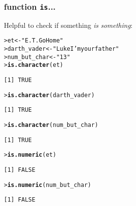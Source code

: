 \documentclass[13pt,aspectratio=169]{beamer}\usepackage[]{graphicx}\usepackage[]{color}
\makeatletter
\newcommand{\hlstr}[1]{\textcolor[rgb]{0.192,0.494,0.8}{#1}}%
\newcommand{\hlstd}[1]{\textcolor[rgb]{0.345,0.345,0.345}{#1}}%
\newcommand{\hlkwb}[1]{\textcolor[rgb]{0.69,0.353,0.396}{#1}}%
\newcommand{\hlkwd}[1]{\textcolor[rgb]{0.737,0.353,0.396}{\textbf{#1}}}%
\newenvironment{kframe}{%
 \def\at@end@of@kframe{}%
 \ifinner\ifhmode%
  \def\at@end@of@kframe{\end{minipage}}%
  \begin{minipage}{\columnwidth}%
 \fi\fi%
 \def\FrameCommand##1{\hskip\@totalleftmargin \hskip-\fboxsep
 \colorbox{shadecolor}{##1}\hskip-\fboxsep
     \hskip-\linewidth \hskip-\@totalleftmargin \hskip\columnwidth}%
 \MakeFramed {\advance\hsize-\width
   \@totalleftmargin\z@ \linewidth\hsize
   \@setminipage}}%
 {\par\unskip\endMakeFramed%
 \at@end@of@kframe}
\newenvironment{knitrout}{}{} %
\renewcommand{\tt}[1]{\texttt{#1}}
\renewenvironment{knitrout}{\setlength{\topsep}{0mm}}{}
\makeatother
\begin{document}
\begin{frame}[fragile]
    \frametitle{function \tt{is}...}
    Helpful to check if something \alert{\textit{is something}}:\\
\begin{knitrout}\small
{}\color{fgcolor}\begin{kframe}
\begin{alltt}
\hlstd{> }\hlstd{et} \hlkwb{<-} \hlstr{"E.T. Go Home"}
\hlstd{> }\hlstd{darth_vader} \hlkwb{<-} \hlstr{"Luke I'm your father"}
\hlstd{> }\hlstd{num_but_char} \hlkwb{<-} \hlstr{"13"}
\hlstd{> }\hlkwd{is.character}\hlstd{(et)}
\end{alltt}
\begin{verbatim}
[1] TRUE
\end{verbatim}
\begin{alltt}
\hlstd{> }\hlkwd{is.character}\hlstd{(darth_vader)}
\end{alltt}
\begin{verbatim}
[1] TRUE
\end{verbatim}
\begin{alltt}
\hlstd{> }\hlkwd{is.character}\hlstd{(num_but_char)}
\end{alltt}
\begin{verbatim}
[1] TRUE
\end{verbatim}
\begin{alltt}
\hlstd{> }\hlkwd{is.numeric}\hlstd{(et)}
\end{alltt}
\begin{verbatim}
[1] FALSE
\end{verbatim}
\begin{alltt}
\hlstd{> }\hlkwd{is.numeric}\hlstd{(num_but_char)}
\end{alltt}
\begin{verbatim}
[1] FALSE
\end{verbatim}
\end{kframe}
\end{knitrout}
\end{frame}
\end{document}
